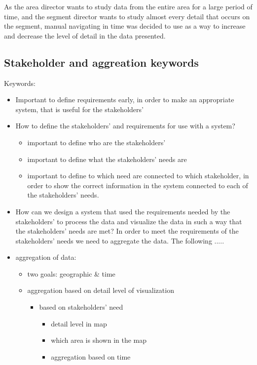 As the area director wants to study data from the entire area for a large 
period of time, and the segment director wants to study almost every detail 
that occurs on the segment, manual navigating in time was decided to use as a 
way to increase and decrease the level of detail in the data presented.

\subsection{Stakeholder and aggreation keywords} %
\label{sub:stakeholder_and_aggreation_keywords}
Keywords:

\begin{itemize}
	\item Important to define requirements early, in order to make an appropriate system, that is useful for the stakeholders'
	\item How to define the stakeholders' and requirements for use with a system?
	\begin{itemize}
		\item important to define who are the stakeholders'
		\item important to define what the stakeholders' needs are
		\item important to define to which need are connected to which stakeholder, in order to show the correct information in the system connected to each of the stakeholders' needs.
	\end{itemize}
	\item How can we design a system that used the requirements needed by the stakeholders' to process the data and visualize the data in such a way that the stakeholders' needs are met?
	In order to meet the requirements of the stakeholders' needs we need to aggregate the data. The following .....
	\item aggregation of data:
	\begin{itemize}
		\item two goals: geographic \& time
		\item aggregation based on detail level of visualization
		\begin{itemize}
			\item based on stakeholders' need
			\begin{itemize}
				\item detail level in map
				\item which area is shown in the map
				\item aggregation based on time
			\end{itemize}

\end{itemize}
\end{itemize}
\end{itemize}

